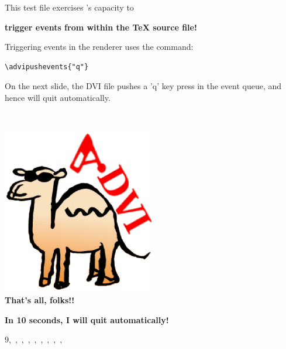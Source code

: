 \documentclass[12pt]{article}
\begin{document}
\newpage

This test file exercises {\ActiveDVI}'s capacity to
\bigskip

{\large {\bf trigger events from within the {\TeX} source file!}}

\bigskip

\noindent
Triggering events in the renderer uses the {\ActiveDVI} command: 

\begin{verbatim}
\advipushevents{"q"}
\end{verbatim}

\bigskip

On the next slide, the DVI file pushes a 'q' key press  in
the event queue, and hence {\ActiveDVI} will quit automatically.

\vfill

\lastpage

~\vfill
\begin{center}
\includegraphics[width=0.5\textwidth]{../tex/advilogo.eps}\\
{\Large \bf That's all, folks!!}
\end{center}
\vfill

{\large {\bf In 10 seconds, I will quit automatically!}}

9,~,~,~,~,~,~,~,~,~~\adviwait[1]

\vfill
\end{document}
